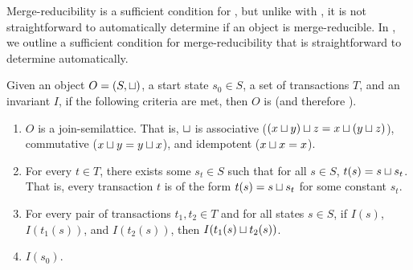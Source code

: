 Merge-reducibility is a sufficient condition for \invariantconfluence{}, but
unlike with \invariantclosure{}, it is not straightforward to automatically
determine if an object is merge-reducible. In , we
outline a sufficient condition for merge-reducibility that is straightforward
to determine automatically.

\begin{theorem}
  Given an object $O = (S, \sqcup)$, a start state $s_0 \in S$, a set of
  transactions $T$, and an invariant $I$, if the following criteria are met,
  then $O$ is \sTImergereducible{} (and therefore \sTIconfluent{}).
  \begin{enumerate}
    \item
      $O$ is a join-semilattice. That is, $\sqcup$ is associative ($(x \sqcup y)
      \sqcup z = x \sqcup (y \sqcup z)$), commutative ($x \sqcup y = y \sqcup x$),
      and idempotent ($x \sqcup x = x$).

    \item
      For every $t \in T$, there exists some $s_t \in S$ such that for all $s
      \in S$, $t(s) = s \sqcup s_t$. That is, every transaction $t$ is of the
      form $t(s) = s \sqcup s_t$ for some constant $s_t$.

    \item
      For every pair of transactions $t_1, t_2 \in T$ and for all states $s \in
      S$, if $I(s)$, $I(t_1(s))$, and $I(t_2(s))$, then $I(t_1(s) \sqcup
      t_2(s))$.

    \item
      $I(s_0)$.
  \end{enumerate}
\end{theorem}

